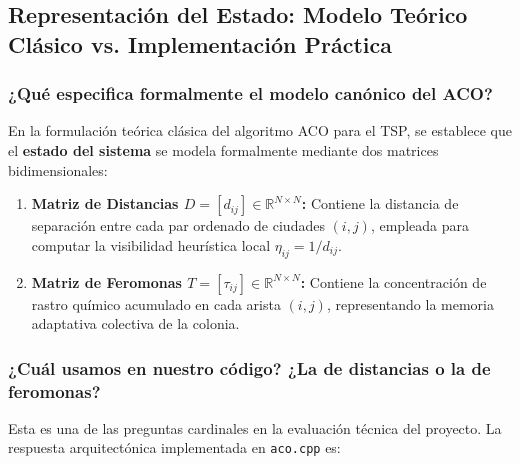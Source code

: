 \documentclass[11pt,a4paper]{article}
\begin{document}
\subsection{Representación del Estado: Modelo Teórico Clásico vs. Implementación Práctica}
\label{sec:estado_teoria_vs_practica}

\subsubsection{¿Qué especifica formalmente el modelo canónico del ACO?}
En la formulación teórica clásica del algoritmo ACO para el TSP, se establece que el \textbf{estado del sistema} se modela formalmente mediante dos matrices bidimensionales:
\begin{enumerate}
    \item \textbf{Matriz de Distancias $D = [d_{ij}] \in \mathbb{R}^{N \times N}$:} Contiene la distancia de separación entre cada par ordenado de ciudades $(i, j)$, empleada para computar la visibilidad heurística local $\eta_{ij} = 1/d_{ij}$.
    \item \textbf{Matriz de Feromonas $T = [\tau_{ij}] \in \mathbb{R}^{N \times N}$:} Contiene la concentración de rastro químico acumulado en cada arista $(i, j)$, representando la memoria adaptativa colectiva de la colonia.
\end{enumerate}

\subsubsection{¿Cuál usamos en nuestro código? ¿La de distancias o la de feromonas?}
Esta es una de las preguntas cardinales en la evaluación técnica del proyecto. La respuesta arquitectónica implementada en \texttt{aco.cpp} es:
\end{document}
